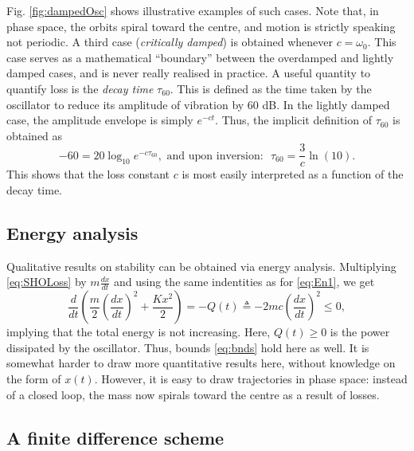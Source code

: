 Fig. \ref{fig:dampedOsc} shows illustrative examples of such cases. Note that, in phase space, the orbits spiral toward the centre, and motion is strictly speaking not periodic.
A third case (\emph{critically damped}) is obtained whenever $c=\omega_0$. This case serves as a mathematical ``boundary'' between the overdamped and lightly damped cases, and is never really realised in practice. A useful quantity to quantify loss is the \emph{decay time} $\tau_{60}$. This is defined as the time taken by the oscillator to reduce its amplitude of vibration by 60 dB. In the lightly damped case, the amplitude envelope is simply $e^{-ct}$. Thus, the implicit definition of $\tau_{60}$ is obtained as
\begin{equation}\label{eq:tau60}
    -60 = 20 \log_{10}e^{-c\tau_{60}}, \,\, \text{and upon inversion: } \,\, \tau_{60} = \frac{3}{c} \ln(10).
\end{equation}
This shows that the loss constant $c$ is most easily interpreted as a function of the decay time.



\subsection{Energy analysis}


Qualitative results on stability can be obtained via energy analysis. Multiplying \eqref{eq:SHOLoss} by $m \frac{dx}{dt}$ and using the same indentities as for \eqref{eq:En1}, we get
\begin{equation}\label{eq:EnBalLoss}
    \frac{d}{dt}\left( \frac{m}{2} \left(\frac{dx}{dt}\right)^2 + \frac{K x^2}{2}   \right) = -Q(t) \triangleq - 2mc \left( \frac{dx}{dt} \right)^2 \leq 0,
\end{equation}
implying that the total energy is not increasing. Here, $Q(t) \geq 0$ is the power dissipated by the oscillator. Thus, bounds \eqref{eq:bnds}  hold here as well. It is somewhat harder to draw more quantitative results here, without knowledge on the form of $x(t).$ However, it is easy to draw trajectories in phase space: instead of a closed loop, the mass now spirals toward the centre as a result of losses. 


\subsection{A finite difference scheme}

